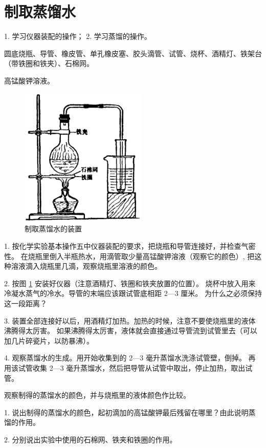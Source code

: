 \section{制取蒸馏水}\label{sec:xssy-sy2}

\begin{shiyanmudi}
    1. 学习仪器装配的操作； 2. 学习蒸馏的操作。
\end{shiyanmudi}

\begin{shiyanyongpin}
    圆底烧瓶、导管、橡皮管、单孔橡皮塞、胶头滴管、试管、烧杯、酒精灯、铁架台（带铁圈和铁夹）、石棉网。

    高锰酸钾溶液。
\end{shiyanyongpin}

\begin{shiyanbuzhou}

    \begin{figure}
        \centering
        \includegraphics[width=6cm]{../pic/czhx1-xssy-17}
        \caption{制取蒸馏水的装置}\label{fig:xssy-17}
    \end{figure}

    1. 按化学实验基本操作五中仪器装配的要求，把烧瓶和导管连接好，并检查气密性。
    在烧瓶里倒入半瓶热水，用滴管取少量高锰酸钾溶液（观察它的颜色）,
    把这种溶液滴入烧瓶里几滴，观察烧瓶里溶液的颜色。

    2. 按图 \ref{fig:xssy-17} 安装好仪器（注意酒精灯、铁圈和铁夹放置的位置）。
    烧杯中放入用来冷凝水蒸气的冷水。导管的末端应该跟试管底相距 2—3 厘米。
    为什么之必须保持这一段距离？

    3. 装置全部连接好以后，用酒精灯加热。加热的时候，注意不要使烧瓶里的液体沸腾得太厉害。
    如果沸腾得太厉害，液体就会直接通过导管流到试管里去（可以加几片碎瓷片，以防暴沸）。

    4. 观察蒸馏水的生成。用开始收集到的 2—3 毫升蒸馏水洗涤试管壁，倒掉。
    再用该试管收集 2—3 毫升蒸馏水，然后把导管从试管中取出，停止加热，取出试管。

    观察制得的蒸馏水的颜色，并与烧瓶里的液体颜色作比较。
\end{shiyanbuzhou}

\begin{wentihetaolun}

    1. 说出制得的蒸馏水的颜色，起初滴加的高锰酸钾最后残留在哪里？由此说明蒸馏的作用。

    2. 分别说出实验中使用的石棉网、铁夹和铁圈的作用。

\end{wentihetaolun}

